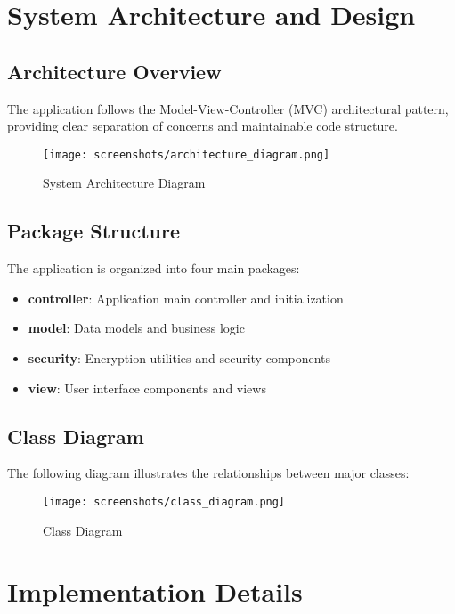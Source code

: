 \documentclass[12pt,a4paper]{article}
\begin{document}
\section{System Architecture and Design}

\subsection{Architecture Overview}
The application follows the Model-View-Controller (MVC) architectural pattern, providing clear separation of concerns and maintainable code structure.

\begin{figure}[H]
    \centering
    \texttt{[image: screenshots/architecture\_diagram.png]}
    \caption{System Architecture Diagram}
    \label{fig:architecture}
\end{figure}

\subsection{Package Structure}
The application is organized into four main packages:

\begin{itemize}
    \item \textbf{controller}: Application main controller and initialization
    \item \textbf{model}: Data models and business logic
    \item \textbf{security}: Encryption utilities and security components
    \item \textbf{view}: User interface components and views
\end{itemize}

\subsection{Class Diagram}
The following diagram illustrates the relationships between major classes:

\begin{figure}[H]
    \centering
    \texttt{[image: screenshots/class\_diagram.png]}
    \caption{Class Diagram}
    \label{fig:class_diagram}
\end{figure}

\section{Implementation Details}
\end{document}
